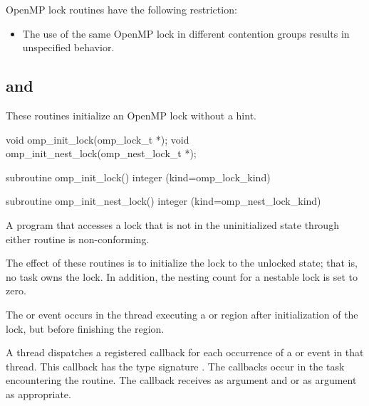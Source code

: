 \restrictions
OpenMP lock routines have the following restriction:

\begin{itemize}
\item The use of the same OpenMP lock in different contention groups 
      results in unspecified behavior.
\end{itemize}



\subsection{ and }
\label{subsec:omp_init_lock and omp_init_nest_lock}
\summary
These routines initialize an OpenMP lock without a hint.

\format
\begin{ccppspecific}
\begin{ompcFunction}
void omp_init_lock(omp_lock_t *);
void omp_init_nest_lock(omp_nest_lock_t *);
\end{ompcFunction}
\end{ccppspecific}

\begin{fortranspecific}
\begin{ompfSubroutine}
subroutine omp_init_lock()
integer (kind=omp_lock_kind) 

subroutine omp_init_nest_lock()
integer (kind=omp_nest_lock_kind) 
\end{ompfSubroutine}
\end{fortranspecific}

\constraints
A program that accesses a lock that is not in the uninitialized state 
through either routine is non-conforming.

\effect
The effect of these routines is to initialize the lock to the unlocked 
state; that is, no task owns the lock. In addition, the nesting count 
for a nestable lock is set to zero.

\events

The  or  event occurs in the thread
executing a  or  region
after initialization of the lock, but before finishing the region.

\tools

A thread dispatches a registered 
callback for each occurrence of a  or  
event in that thread.  This callback has the type signature 
. The callbacks occur in the 
task encountering the routine. The callback receives 
 as  argument and  or
  as  argument as appropriate.

